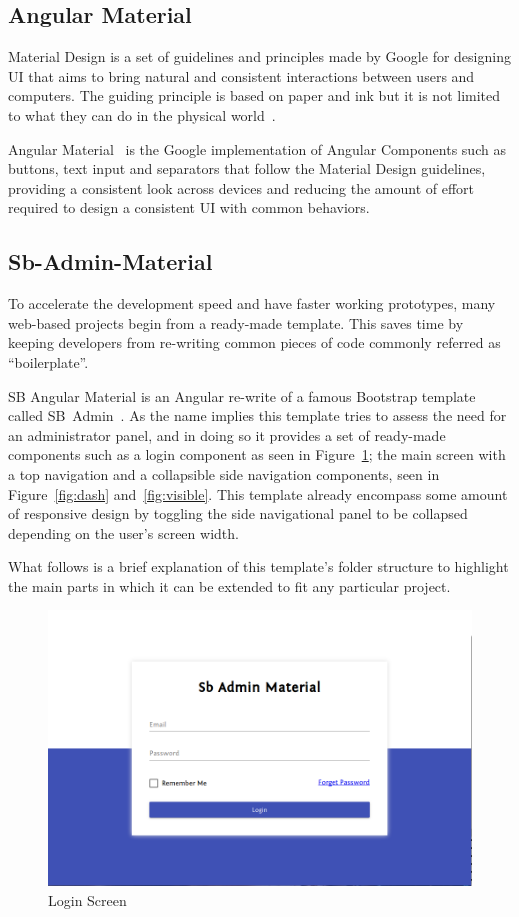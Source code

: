 \subsection{Angular Material}
Material Design is a set of guidelines and principles made by Google for designing \gls{UI} that aims to bring natural and consistent interactions between users and computers. The guiding principle is based on paper and ink but it is not limited to what they can do in the physical world~\cite{materialdesign}.

Angular Material~\cite{angularmaterial} is the Google implementation of Angular Components such as buttons, text input and separators that follow the Material Design guidelines, providing a consistent look across devices and reducing the amount of effort required to design a consistent \gls{UI} with common behaviors.

\subsection{Sb-Admin-Material}\label{template}
To accelerate the development speed and have faster working prototypes, many web-based projects begin from a ready-made template. This saves time by keeping developers from re-writing common pieces of code commonly referred as ``boilerplate''.

SB Angular Material is an Angular re-write of a famous Bootstrap template called SB~Admin~\cite{angulartemplate}.
As the name implies this template tries to assess the need for an administrator panel, and in doing so it provides a set of ready-made components such as a login component as seen in Figure~\ref{fig:login}; the main screen with a top navigation and a collapsible side navigation components, seen in Figure~\ref{fig:dash} and~\ref{fig:visible}. This template already encompass some amount of responsive design by toggling the side navigational panel to be collapsed depending on the user's screen width.

What follows is a brief explanation of this template's folder structure to highlight the main parts in which it can be extended to fit any particular project.

\begin{figure}
  \centering
  \includegraphics[width=.8\textwidth]{images/sbadmin/login}
  \caption{Login Screen}\label{fig:login}
\end{figure}

